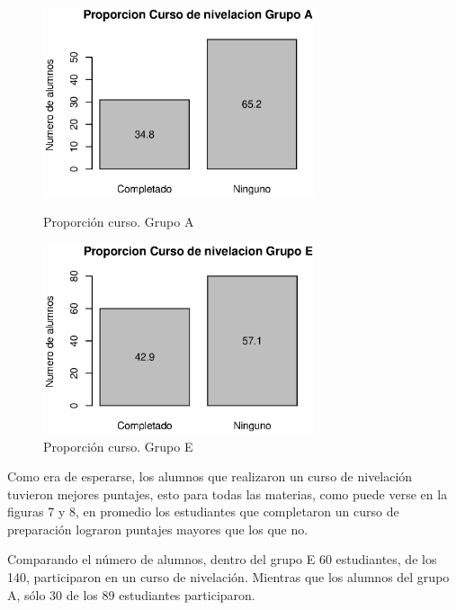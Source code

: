 \documentclass{article}
\begin{document}
    \begin{figure}[ht]
        \begin{minipage}[b]{0.45\linewidth}
            \includegraphics[width=8cm]{Output/Plots/figura9.eps}
            \vspace*{-15mm}
            \caption{Proporci\'on curso. Grupo A}
            \label{fig:minipage1}
        \end{minipage}
        \hspace{0.2cm}
        \begin{minipage}[b]{0.45\linewidth}
            \includegraphics[width=8cm]{Output/Plots/figura10.eps}
            \vspace*{-15mm}
            \caption{Proporci\'on curso. Grupo E}
            \label{fig:minipage2}
        \end{minipage}
    \end{figure}

    Como era de esperarse, los alumnos que realizaron un curso de nivelaci\'on tuvieron mejores puntajes,
    esto para todas las materias, como puede verse en la figuras 7 y 8, en promedio los estudiantes que completaron
    un curso de preparaci\'on lograron puntajes mayores que los que no.

    Comparando el n\'umero de alumnos, dentro del grupo E 60 estudiantes, de los 140, participaron en un curso de nivelaci\'on.
    Mientras que los alumnos del grupo A, s\'olo 30 de los 89 estudiantes participaron.
\end{document}
